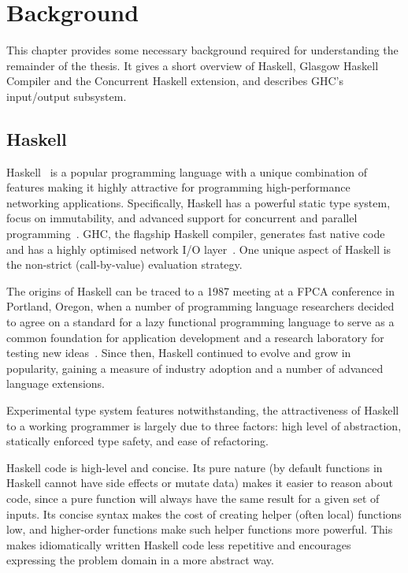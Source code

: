 \documentclass[a4paper,11pt,oneside]{report}
\begin{document}
\chapter{Background}
\label{chap:background}

This chapter provides some necessary background required for understanding the
remainder of the thesis. It gives a short overview of Haskell, Glasgow Haskell
Compiler and the Concurrent Haskell extension, and describes GHC's input/output
subsystem.

\section{Haskell}

Haskell~\cite{bib:haskell2010} is a popular programming language with a unique
combination of features making it highly attractive for programming
high-performance networking applications. Specifically, Haskell has a powerful
static type system, focus on immutability, and advanced support for concurrent
and parallel programming~\cite{bib:marlow2013}. GHC, the flagship Haskell
compiler, generates fast native code and has a highly optimised network I/O
layer~\cite{bib:voellmy}. One unique aspect of Haskell is the non-strict
(call-by-value) evaluation strategy.

The origins of Haskell can be traced to a 1987 meeting at a FPCA conference in
Portland, Oregon, when a number of programming language researchers decided to
agree on a standard for a lazy functional programming language to serve as a
common foundation for application development and a research laboratory for
testing new ideas~\cite{bib:hudak2007}. Since then, Haskell continued to evolve
and grow in popularity, gaining a measure of industry adoption and a number of
advanced language extensions.

Experimental type system features notwithstanding, the attractiveness of Haskell
to a working programmer is largely due to three factors: high level of
abstraction, statically enforced type safety, and ease of refactoring.

Haskell code is high-level and concise. Its pure nature (by default functions in
Haskell cannot have side effects or mutate data) makes it easier to reason about
code, since a pure function will always have the same result for a given set of
inputs. Its concise syntax makes the cost of creating helper (often local)
functions low, and higher-order functions make such helper functions more
powerful. This makes idiomatically written Haskell code less repetitive and
encourages expressing the problem domain in a more abstract way.
\end{document}
